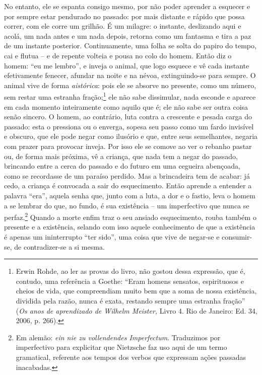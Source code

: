 No entanto, ele se espanta consigo mesmo, por não poder aprender a
esquecer e por sempre estar pendurado no passado: por mais distante e
rápido que possa correr, com ele corre um grilhão. É um milagre: o
instante, deslizando aqui e acolá, um nada antes e um nada depois,
retorna como um fantasma e tira a paz de um instante posterior.
Continuamente, uma folha se solta do papiro do tempo, cai e flutua -- e
de repente volteia e pousa no colo do homem. Então diz o homem: ``eu me
lembro'', e inveja o animal, que logo esquece e vê cada instante
efetivamente fenecer, afundar na noite e na névoa, extinguindo-se para
sempre. O animal vive de forma \emph{aistórica}: pois ele se absorve no
presente, como um número, sem restar uma estranha fração;\footnote{Erwin
  Rohde, ao ler as provas do livro, não gostou dessa expressão, que é,
  contudo, uma referência a Goethe: ``Eram homens sensatos, espirituosos
  e cheios de vida, que compreendiam muito bem que a soma de nossa
  existência, dividida pela razão, nunca é exata, restando sempre uma
  estranha fração'' (\emph{Os anos de aprendizado de Wilhelm Meister,}
  Livro 4. Rio de Janeiro: Ed. 34, 2006, p. 266).} ele não sabe
dissimular, nada esconde e aparece em cada momento inteiramente como
aquilo que é; ele não sabe ser outra coisa senão sincero. O homem, ao
contrário, luta contra a crescente e pesada carga do passado: esta o
pressiona ou o enverga, sopesa seu passo como um fardo invisível e
obscuro, que ele pode negar como ilusório e que, entre seus semelhantes,
negaria com prazer para provocar inveja. Por isso ele se comove ao ver
o rebanho pastar ou, de forma mais próxima, vê a criança, que nada tem a
negar do passado, brincando entre a cerca do passado e do futuro em uma
cegueira abençoada, como se recordasse de um paraíso perdido. Mas a
brincadeira tem de acabar: já cedo, a criança é convocada a sair do
esquecimento. Então aprende a entender a palavra ``era'', aquela senha
que, junto com a luta, a dor e o fastio, leva o homem a se lembrar do
que, no fundo, é sua existência -- um imperfectivo que nunca se
perfaz.\footnote{Em alemão: \emph{ein nie zu vollendendes Imperfectum}.
  Traduzimos por imperfectivo para explicitar que Nietz\-sche faz uso aqui
  de um termo gramatical, referente aos tempos dos verbos que expressam
  ações passadas inacabadas.} Quando a morte enfim traz o seu ansiado
esquecimento, rouba também o presente e a existência, selando com
isso aquele conhecimento de que a existência é apenas um ininterrupto
``ter sido'', uma coisa que vive de negar-se e consumir-se, de
contradizer-se a si mesma.

